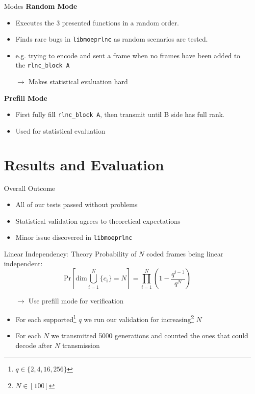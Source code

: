 \documentclass[t]{beamer} %
\begin{document}
\begin{frame}{Modes}
	\textbf{Random Mode}
	\begin{itemize}
		\item Executes the 3 presented functions in a random order.
		\item Finds rare bugs in \texttt{libmoeprlnc} as random scenarios are tested.
		\item e.g. trying to encode and sent a frame when no frames have been added to the \texttt{rlnc\_block A}
		      \pause
		\item[$\rightarrow$] Makes statistical evaluation hard
	\end{itemize}
	\pause
	\textbf{Prefill Mode}
	\begin{itemize}
		\item First fully fill \texttt{rlnc\_block A}, then transmit until B side has full rank.
		\item Used for statistical evaluation
	\end{itemize}
\end{frame}

\section{Results and Evaluation}

\begin{frame}{Overall Outcome}
	\begin{itemize}
		\item All of our tests passed without problems
		\item Statistical validation agrees to theoretical expectations
		\item Minor issue discovered in \texttt{libmoeprlnc}
	\end{itemize}
\end{frame}


\begin{frame}{Linear Independency: Theory}
	Probability of $N$ coded frames being linear independent:
	\begin{equation} 
		\text{Pr}\left[\text{dim}\bigcup_{i=1}^{N}\{c_i\} = N\right] = \prod_{i=1}^{N} \left(1 - \frac{q^{i - 1}}{q ^ {N}}\right)
		\label{eq:decode_prob}
	\end{equation}
	\begin{itemize}
		\item[$\rightarrow$] Use prefill mode for verification
		\item For each supported\footnote{$q\in\{2, 4, 16, 256\}$} $q$ we run our validation for increasing\footnote{$N\in[100]$} $N$
		\item For each $N$ we transmitted 5000 generations and counted the ones that could decode after $N$ transmission
	\end{itemize}
\end{frame}
\end{document}
